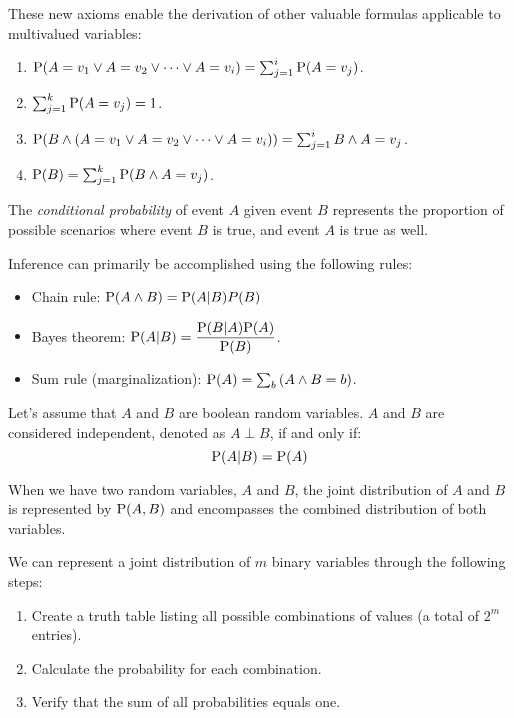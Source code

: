 These new axioms enable the derivation of other valuable formulas applicable to multivalued variables:    \begin{enumerate}
    \item $\textnormal{P}(A=v_1 \lor A=v_2 \lor \dots \lor A=v_i)=\sum_{j=1}^{i}{\textnormal{P}(A=v_j)}$.
    \item $\sum_{j=1}^{k}{\textnormal{P}(A=v_j)}=1$. 
    \item $\textnormal{P}(B \land (A=v_1 \lor A=v_2 \lor \dots \lor A=v_i))=\sum_{j=1}^{i}{B \land A=v_j}$. 
    \item $\textnormal{P}(B)=\sum_{j=1}^{k}{\textnormal{P}(B \land A=v_j)}$.
\end{enumerate}
\begin{definition}
    The \emph{conditional probability} of event $A$ given event $B$ represents the proportion of possible scenarios where event $B$ is true, and event $A$ is true as well.
\end{definition}
Inference can primarily be accomplished using the following rules:
\begin{itemize}
    \item Chain rule: $\textnormal{P}(A \land B)=\textnormal{P}(A|B)P(B)$
    \item Bayes theorem: $\textnormal{P}(A|B)=\dfrac{\textnormal{P}(B|A)\textnormal{P}(A)}{\textnormal{P}(B)}$.
    \item Sum rule (marginalization): $\textnormal{P}(A)=\sum_{b}{(A \land B=b)}$.
\end{itemize}
\begin{definition}
    Let's assume that $A$ and $B$ are boolean random variables. $A$ and $B$ are considered independent, denoted as $A \perp B$, if and only if:
    \[\textnormal{P}(A|B)=\textnormal{P}(A)\]

    When we have two random variables, $A$ and $B$, the joint distribution of $A$ and $B$ is represented by $\textnormal{P}(A, B)$ and encompasses the combined distribution of both variables.    
\end{definition}
We can represent a joint distribution of $m$ binary variables through the following steps:
\begin{enumerate}
    \item Create a truth table listing all possible combinations of values (a total of $2^m$ entries).
    \item Calculate the probability for each combination.
    \item Verify that the sum of all probabilities equals one.
\end{enumerate}